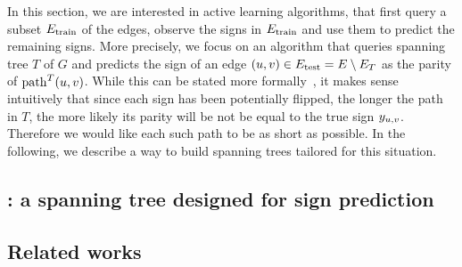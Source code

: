 \documentclass[nobib, a4paper, 10pt, oneside, onecolumn, openany, notitlepage, final,
svgnames, marginals=raggedouter, english,
]{article}
\begin{document}
In this section, we are interested in active learning algorithms, that first query a subset
$E_{\mathrm{train}}$ of the edges, observe the signs in $E_{\mathrm{train}}$ and use them to predict the remaining signs.
More precisely, we focus on an algorithm that queries spanning tree $T$ of $G$ and predicts the sign
of an edge $(u,v) \in E_{\mathrm{test}} = E \setminus E_T$ as the parity of $\operatorname{path}^T(u, v)$. While this
can be stated more formally~\autocite[Section
4.1]{Cesa-Bianchi2012b}, it makes sense intuitively that since each sign has been potentially
flipped, the longer the path in $T$, the more likely its parity will be not be equal to the true
sign $y_{u, v}{}$. Therefore we would like each such path to be as short as possible. In the following,
we describe a way to build spanning trees tailored for this situation.

\subsection{\gtx{}: a spanning tree designed for sign prediction}
\label{sub:gtx_a_simple_low_stretch_tree_construction}



\subsection{Related works}
\label{sub:gtx_related_works}



\iffalse
\url{http://www.siam.org/meetings/da17/schedule.html} SODA 13B \url{http://dl.acm.org/citation.cfm?id=3039686}
for instance the Elkin paper \enquote{Our centralized randomized algorithm computes (with
probability close to 1), a $(2k - 1)$-spanner with $n \cdot (1 + O(\frac{\log k}{n}))$ edges in
$O(|E|)$ time, whenever $k = \Omega(\log n)$. Note that when $k = \omega(\log n)$, the number of
edges is $n(1+o(1))$, i.e., in this range the algorithm computes an ultra-sparse spanner in $O(|E|)$
time.} For instance, if $k=5\log n$, we get a $10\log n$-spanner with $n\left(1+O\left(\frac{\log\log
n}{n}\right)\right)$ edges in $O(|E|)$ time.

While they have many applications [see first paragraph of \url{https://arxiv.org/pdf/1401.2454.pdf},
which was later merged in a STOC'14 paper] (a major one being solving linear system), in some
practical situations their advantages are less clear [from
\url{https://link.springer.com/chapter/10.1007/978-3-319-20086-6_16}\enquote{for reasonable inputs
the constant factors make the solver much slower than methods with higher asymptotic complexity.
One other aspect predicted by theory is confirmed by our findings: Spanning trees with lower
stretch indeed reduce the solver's running time. Yet, simple spanning tree algorithms perform
better in practice than those with a guaranteed low stretch.} this is improved by
\url{https://link.springer.com/chapter/10.1007%2F978-3-319-20086-6_17} although they seem to work
	mostly with the Laplacian of the tree ]
\fi
\end{document}
